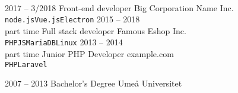 \documentclass[9pt]{developercv} %
\begin{document}
\begin{minipage}[t]{0.4\textwidth} %
	\vspace{-\baselineskip} %
	
	\lorem \lorem \lorem \lorem \lorem\\ %
\end{minipage}
\hfill %
\begin{minipage}[t]{0.5\textwidth} %
	\vspace{-\baselineskip} %
	\begin{barchart}{5.5}
	\end{barchart}
\end{minipage}



\begin{entrylist}
	\entry
		{2017 -- 3/2018}
		{Front-end developer}
		{Big Corporation Name Inc.}
		{\lorem \lorem \lorem\\ \texttt{node.js}\slashsep\texttt{Vue.js}\slashsep\texttt{Electron}}
	\entry
		{2015 -- 2018\\\footnotesize{part time}}
		{Full stack developer}
		{Famous Eshop Inc.}
		{\lorem\lorem\\ \texttt{PHP}\slashsep\texttt{JS}\slashsep\texttt{MariaDB}\slashsep\texttt{Linux}}
	\entry
		{2013 -- 2014\\\footnotesize{part time}}
		{Junior PHP Developer}
		{example.com}
		{\lorem\lorem\\ \texttt{PHP}\slashsep\texttt{Laravel}}
\end{entrylist}


\raggedright

\begin{entrylist}
	\entry
		{2007 -- 2013}
		{Bachelor's Degree}
		{Umeå Universitet}
		{\lorem\lorem}
\end{entrylist}
\end{document}
